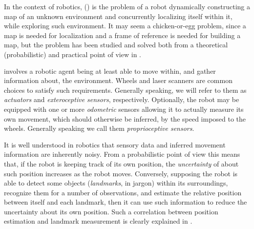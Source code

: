 In the context of robotics, \Slam{} (\SLAM) is the problem of a robot dynamically constructing a map of an unknown environment and concurrently localizing itself within it, while exploring such environment. 
It may seem a chicken-or-egg problem, since a map is needed for localization and a frame of reference is needed for building a map, but the problem has been studied and solved both from a theoretical (probabilistic) and practical point of view in \cite{thrun2005}.

\SLAM{} involves a robotic agent being at least able to move within, and gather information about, the environment. Wheels and laser scanners are common choices to satisfy such requirements. 
Generally speaking, we will refer to them as \emph{actuators} and \emph{exteroceptive sensors}, respectively. 
Optionally, the robot may be equipped with one or more \emph{odometric} sensors allowing it to actually measure its own movement, which should otherwise be inferred, \eg{} by the speed imposed to the wheels. 
Generally speaking we call them \emph{proprioceptive sensors}. 

It is well understood in robotics that sensory data and inferred movement information are inherently noisy. 
From a probabilistic point of view this means that, if the robot is keeping track of its own position, the \emph{uncertainty} of about such position increases as the robot moves. 
Conversely, supposing the robot is able to detect some objects (\emph{landmarks}, in jargon) within its surroundings, recognize them for a number of observations, and estimate the relative position between itself and each landmark, then it can use such information to reduce the uncertainty about its own position.
Such a correlation between position estimation and landmark measurement is clearly explained in \cite[Unit C]{brenner204}.

